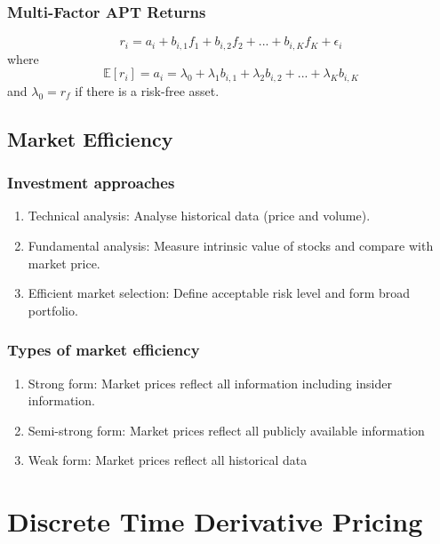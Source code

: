 \documentclass[11pt]{article}
\newcommand{\E}{\mathbb{E}}
\begin{document}
	\subsubsection{Multi-Factor APT Returns}
	\[	r_i = a_i + b_{i,1 }f_1 + b_{i,2} f_2 + ... + b_{i, K}f_K + \epsilon_i\]
	where
	\[	\E[r_i] = a_i = \lambda_0 + \lambda_1 b_{i,1} + \lambda_2 b_{i, 2} + ... + \lambda_K b_{i, K}\]
	and \( \lambda_0 = r_f \) if there is a risk-free asset. 
	\subsection{Market Efficiency}
	\subsubsection{Investment approaches}
	\begin{enumerate}
		\item Technical analysis: Analyse historical data (price and volume).
		\item Fundamental analysis: Measure intrinsic value of stocks and compare with market price.
		\item Efficient market selection: Define acceptable risk level and form broad portfolio.
	\end{enumerate}
	\subsubsection{Types of market efficiency}
	\begin{enumerate}
		\item Strong form: Market prices reflect all information including insider information.
		\item Semi-strong form: Market prices reflect all publicly available information %
		\item Weak form: Market prices reflect all historical data 
	\end{enumerate}
	\newpage
	\section{Discrete Time Derivative Pricing}
\end{document}
